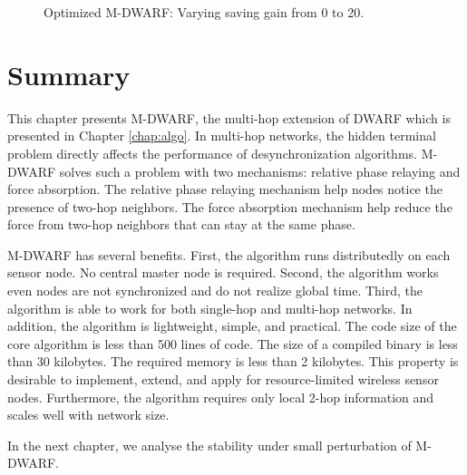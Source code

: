 \begin{figure}
{{	\label{fig:beta-16}}
}
\caption{Optimized M-DWARF: Varying saving gain from 0 to 20.}%
\label{fig:vary-saving}%
\lofcont
\end{figure}

\section{Summary}
\label{sec:multihop-summary}
This chapter presents M-DWARF, the multi-hop extension of DWARF which is presented in Chapter \ref{chap:algo}.
In multi-hop networks, the hidden terminal problem directly affects the performance of desynchronization algorithms. M-DWARF solves such a problem with two mechanisms: relative phase relaying and force absorption.
The relative phase relaying mechanism help nodes notice the presence of two-hop neighbors. The force absorption mechanism help reduce the force from two-hop neighbors that can stay at the same phase.

M-DWARF has several benefits. First, the algorithm runs distributedly on each sensor node. No central master node is required. Second, the algorithm works even nodes are not synchronized and do not realize global time. Third, the algorithm is able to work for both single-hop and multi-hop networks. In addition, the algorithm is lightweight, simple, and practical. The code size of the core algorithm is less than 500 lines of code. The size of a compiled binary is less than 30 kilobytes. The required memory is less than 2 kilobytes. This property is desirable to implement, extend, and apply for resource-limited wireless sensor nodes. Furthermore, the algorithm requires only local 2-hop information and scales well with network size.  

In the next chapter, we analyse the stability under small perturbation of M-DWARF.


